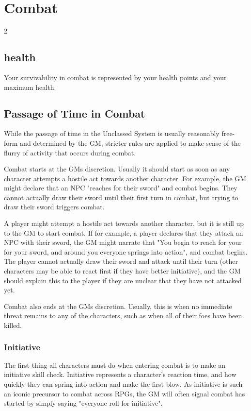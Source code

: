 \chapter{Combat}\label{combat}

\begin{multicols*}{2}

    \section{health}\label{health points}\label{maximum health points}
    Your survivability in combat is represented by your health points
    and your maximum health. %

    \section{Passage of Time in Combat}
    While the passage of time in the Unclassed System is usually reasonably
    free-form and determined by the GM, stricter rules are applied to make
    sense of the flurry of activity that occurs during combat.

    Combat starts at the GMs discretion. Usually it should start as soon as
    any character attempts a hostile act towards another character. For
    example, the GM might declare that an NPC "reaches for their sword" and
    combat begins. They cannot actually draw their sword until their first
    turn in combat, but trying to draw their sword triggers combat.

    A player might attempt a hostile act towards another character, but it is
    still up to the GM to start combat. If for example, a player declares that
    they attack an NPC with their sword, the GM might narrate that "You begin
    to reach for your for your sword, and around you everyone springs into
    action", and combat begins. The player cannot actually draw their sword
    and attack until their turn (other characters may be able to react first
    if they have better initiative), and the GM should explain this to the
    player if they are unclear that they have not attacked yet.

    Combat also ends at the GMs discretion. Usually, this is when no immediate
    threat remains to any of the characters, such as when all of their foes
    have been killed.

    \subsection{Initiative}
    The first thing all characters must do when entering combat is to make an
    initiative skill check. Initiative represents a character's reaction time,
    and how quickly they can spring into action and make the first blow. As
    initiative is such an iconic precursor to combat across RPGs, the GM will
    often signal combat has started by simply saying "everyone roll for
    initiative".


\end{multicols*}
